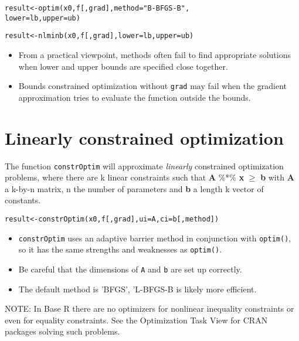 \documentclass[11pt,a4paper,onecolumn,oneside]{extarticle}
\begin{document}
\begin{landscape}
\begin{multicols}{2}
\begin{alltt}
 result <- optim(x0, f [, grad], method = "B-BFGS-B",
                 lower = lb, upper = ub)
\end{alltt}

\begin{alltt}
 result <- nlminb(x0, f [, grad], lower = lb, upper = ub)
\end{alltt}

\begin{itemize}
\setlength\itemsep{0.1em}
\item
  From a practical viewpoint, methods often fail to find appropriate
  solutions when lower and upper bounds are specified close together.
\item
  Bounds constrained optimization without \verb|grad| may fail when the
  gradient approximation tries to evaluate the function outside the bounds.
\end{itemize}


\section*{\color{darkred} Linearly constrained optimization}

The function \texttt{constrOptim} will approximate \textit{linearly} 
constrained optimization problems, where there are k linear constraints 
such that \textbf{A} \%*\% \textbf{x} $\ge$ \textbf{b}
with \textbf{A} a k-by-n matrix, n the number of parameters and
\textbf{b} a length k vector of constants.

\begin{alltt}
 result <- constrOptim(x0, f [, grad], ui=A, ci=b[, method])
\end{alltt}

\begin{itemize}
\setlength\itemsep{0.1em}
\item
  \texttt{constrOptim} uses an adaptive barrier method in conjunction
  with \texttt{optim()}, so it has the same strengths and weaknesses as
  \texttt{optim()}.
\item
  Be careful that the dimensions of \texttt{A} and \texttt{b} are set
  up correctly.
\item
  The default method is 'BFGS', 'L-BFGS-B is likely more efficient.
\end{itemize}

NOTE: In Base R there are no optimizers for nonlinear inequality constraints
or even for equality constraints. See the Optimization Task View for CRAN 
packages solving such problems.



\end{multicols}
\end{landscape}
\end{document}
